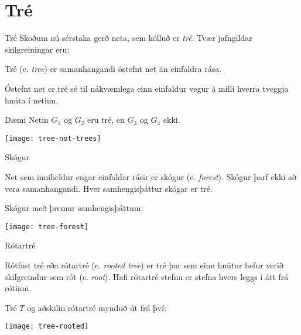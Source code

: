 \documentclass[handout]{beamer}
\begin{document}
\section{Tré}

\begin{frame}{Tré}
Skoðum nú sérstaka gerð neta, sem kölluð er \emph{tré}. Tvær jafngildar skilgreiningar eru:

\begin{tcolorbox}[title=Tré]
Tré (e. \emph{tree}) er samanhangandi óstefnt net án einfaldra rása.
\end{tcolorbox}

\begin{tcolorbox}[title=Tré]
Óstefnt net er tré sé til nákvæmlega einn einfaldur vegur á milli hverra tveggja hnúta í netinu.
\end{tcolorbox}

\end{frame}

\begin{frame}{Dæmi}
Netin $G_1$ og $G_2$ eru tré, en $G_3$ og $G_4$ ekki.
\begin{center}
\texttt{[image: tree-not-trees]}
\end{center}
\end{frame}

\begin{frame}{Skógur}
\begin{tcolorbox}[title=Skógur]
Net sem inniheldur engar einfaldar rásir er skógur (e. \emph{forest}). Skógur þarf ekki að vera samanhangandi. Hver samhengisþáttur skógar er tré.
\end{tcolorbox}
Skógur með þremur samhengisþáttum:
\begin{center}
\texttt{[image: tree-forest]}
\end{center}
\end{frame}

\begin{frame}{Rótartré}
\begin{tcolorbox}[title=Rótartré]
Rótfast tré eða rótartré (e. \emph{rooted tree}) er tré þar sem einn hnútur hefur verið skilgreindur sem rót (e. \emph{root}). Hafi rótartré stefnu er stefna hvers leggs í átt frá rótinni.
\end{tcolorbox}
Tré $T$ og aðskilin rótartré mynduð út frá því:
\begin{center}
\texttt{[image: tree-rooted]}
\end{center}
\end{frame}
\end{document}
